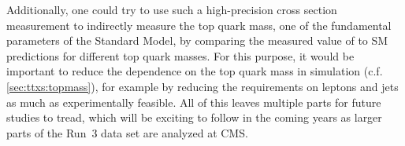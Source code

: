 Additionally, one could try to use such a high-precision \ttbar cross section measurement to indirectly measure the top quark mass, one of the fundamental parameters of the Standard Model, by comparing the measured value of \sigmatt to SM predictions for different top quark masses. For this purpose, it would be important to reduce the dependence on the top quark mass in simulation (c.f. \cref{sec:ttxs:topmass}), for example by reducing the \pt requirements on leptons and jets as much as experimentally feasible. 
All of this leaves multiple parts for future studies to tread, which will be exciting to follow in the coming years as larger parts of the Run~3 data set are analyzed at CMS.
